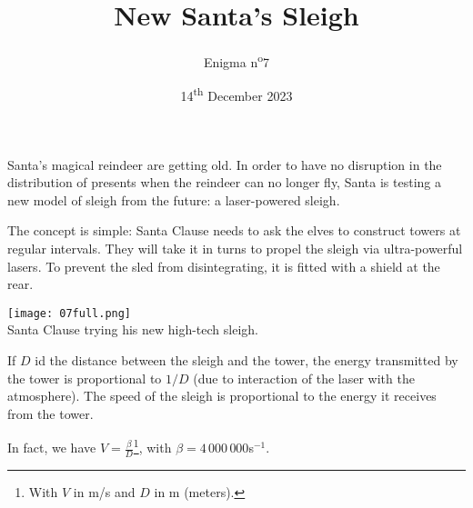 \documentclass[a4paper, top=10mm]{article}
\title{\textbf{\huge{New Santa's Sleigh}}}
\author{Enigma n\textsuperscript{o}7}
\date{14\textsuperscript{th} December 2023}
\begin{document}
	\maketitle
	
	Santa's magical reindeer are getting old.
	In order to have no disruption in the distribution of presents when the reindeer can no longer fly, Santa is testing a new model of sleigh from the future: a laser-powered sleigh.
	
	The concept is simple: Santa Clause needs to ask the elves to construct towers at regular intervals.
	They will take it in turns to propel the sleigh via ultra-powerful lasers.
	To prevent the sled from disintegrating, it is fitted with a shield at the rear.
	
	\begin{center}
		\texttt{[image: 07full.png]}\\
		Santa Clause trying his new high-tech sleigh.
	\end{center}
	
	If $D$ id the distance between the sleigh and the tower, the energy transmitted by the tower is proportional to $1/D$ (due to interaction of the laser with the atmosphere).
	The speed of the sleigh is proportional to the energy it receives from the tower.
	
	In fact, we have $V = \frac{\beta}{D}$\footnote{With $V$ in m/s and $D$ in m (meters).}, with $\beta=4\,000\,000$s$ ^{-1}$.
	
	
\end{document}
